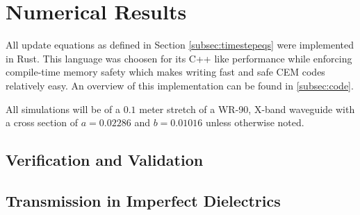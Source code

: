 \section{Numerical Results}
\label{sec:numres} 
All update equations as defined in Section \ref{subsec:timestepeqs} were implemented in Rust. This language was choosen for its C++ like performance while enforcing compile-time memory safety which makes writing fast and safe CEM codes relatively easy. An overview of this implementation can be found in \ref{subsec:code}.

All simulations will be of a $0.1$ meter stretch of a WR-90, X-band waveguide with a cross section of $a=0.02286$ and $b=0.01016$ \cite{everythingrf} unless otherwise noted.

\subsection{Verification and Validation}
\label{subsec:vv}

\subsection{Transmission in Imperfect Dielectrics}